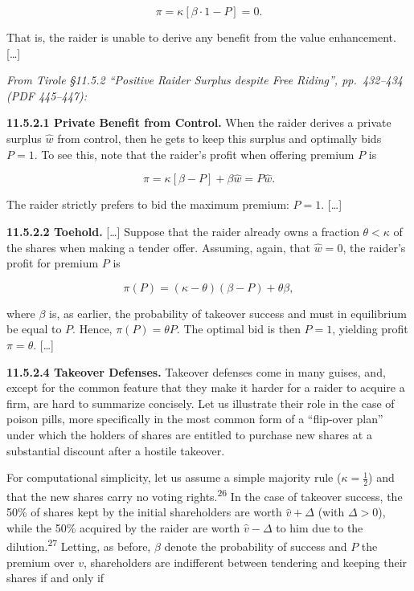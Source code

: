 \documentclass[11pt,a4paper]{article}
\begin{document}
\[\pi = \kappa[\beta \cdot 1 - P] = 0.\]

That is, the raider is unable to derive any benefit from the value enhancement. {[}\ldots{]}

\emph{From Tirole §11.5.2 ``Positive Raider Surplus despite Free Riding'', pp.~432--434 (PDF
445--447):}

\textbf{11.5.2.1 Private Benefit from Control.} When the raider derives a private surplus \(\hat w\)
from control, then he gets to keep this surplus and optimally bids \(P = 1\). To see this, note that
the raider's profit when offering premium \(P\) is

\[\pi = \kappa[\beta - P] + \beta\hat w = P\hat w.\]

The raider strictly prefers to bid the maximum premium: \(P = 1\). {[}\ldots{]}

\textbf{11.5.2.2 Toehold.} {[}\ldots{]} Suppose that the raider already owns a fraction
\(\theta < \kappa\) of the shares when making a tender offer. Assuming, again, that \(\hat w = 0\),
the raider's profit for premium \(P\) is

\[\pi(P) = (\kappa - \theta)(\beta - P) + \theta\beta,\]

where \(\beta\) is, as earlier, the probability of takeover success and must in equilibrium be equal
to \(P\). Hence, \(\pi(P) = \theta P\). The optimal bid is then \(P = 1\), yielding profit
\(\pi = \theta\). {[}\ldots{]}

\textbf{11.5.2.4 Takeover Defenses.} Takeover defenses come in many guises, and, except for the
common feature that they make it harder for a raider to acquire a firm, are hard to summarize
concisely. Let us illustrate their role in the case of poison pills, more specifically in the most
common form of a ``flip-over plan'' under which the holders of shares are entitled to purchase new
shares at a substantial discount after a hostile takeover.

For computational simplicity, let us assume a simple majority rule (\(\kappa = \frac{1}{2}\)) and
that the new shares carry no voting rights.\textsuperscript{26} In the case of takeover success, the
50\% of shares kept by the initial shareholders are worth \(\hat v + \Delta\) (with \(\Delta > 0\)),
while the 50\% acquired by the raider are worth \(\hat v - \Delta\) to him due to the
dilution.\textsuperscript{27} Letting, as before, \(\beta\) denote the probability of success and
\(P\) the premium over \(v\), shareholders are indifferent between tendering and keeping their
shares if and only if
\end{document}
